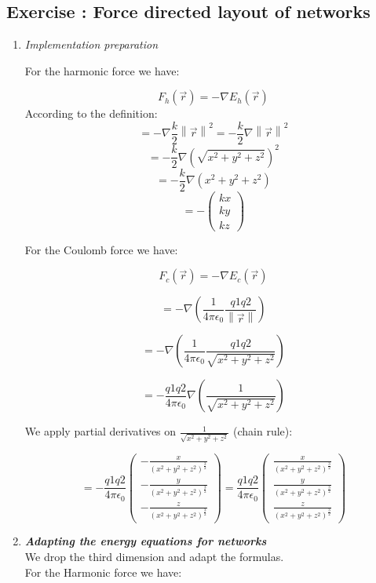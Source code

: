 \documentclass[10pt,a4paper]{article}
\newcommand{\norm}[1]{\left\lVert#1\right\rVert}
\newcommand{\exercise}[1]
{
  \stepcounter{subsection}
  \subsection*{Exercise \thesubsection: #1}

}
\begin{document}
\newpage
\exercise{Force directed layout of networks}
\begin{enumerate}
	
	\item \textit{Implementation preparation}
	
	For the harmonic force we have: 
	
	
\[ F_{h}(\vec{r}) = -\nabla E_{h}(\vec{r})\]
According to the definition: 
\[ = -\nabla \frac{k}{2} \norm{\vec{r}}^2 = -\frac{k}{2} \nabla \norm{\vec{r}}^2 \]
\[ = -\frac{k}{2}\nabla  (\sqrt{x^2 + y^2 + z^2})^2  \]
\[ = -\frac{k}{2}\nabla  (x^2 + y^2 + z^2)  \]
\[ = -\begin{pmatrix}
kx\\
ky\\
kz
	\end{pmatrix} \]


	For the Coulomb force we have: 
	
	\[ F_{c}(\vec{r}) = -\nabla E_{c}(\vec{r})\]

	\[ = -\nabla(\frac{1}{4\pi\epsilon_{0}} \frac{q1 q2}{\norm{\vec{r}}}) \]
	
	\[ = -\nabla(\frac{1}{4\pi\epsilon_{0}} \frac{q1 q2}{\sqrt{x^2 + y^2 + z^2}}) \]
	
	\[ = - \frac{q1 q2}{4\pi\epsilon_{0}} \nabla ( \frac{1}{\sqrt{x^2 + y^2 + z^2}}) \]
	
	We apply partial derivatives on $ \frac{1}{\sqrt{x^2 + y^2 + z^2}}$ (chain rule): 
	
	\[ = - \frac{q1 q2}{4\pi\epsilon_{0}} \begin{pmatrix}
	-\frac{x}{(x^2 + y^2 + z^2)^{\frac{3}{2}}}\\
	-\frac{y}{(x^2 + y^2 + z^2)^{\frac{3}{2}}}\\
	-\frac{z}{(x^2 + y^2 + z^2)^{\frac{3}{2}}}
	\end{pmatrix} = \frac{q1 q2}{4\pi\epsilon_{0}} \begin{pmatrix}
	\frac{x}{(x^2 + y^2 + z^2)^{\frac{3}{2}}}\\
	\frac{y}{(x^2 + y^2 + z^2)^{\frac{3}{2}}}\\
	\frac{z}{(x^2 + y^2 + z^2)^{\frac{3}{2}}}
	\end{pmatrix} \]
	
	
	
	\item \textit{\textbf{Adapting the energy equations for networks}}\\
	
	
	We drop the third dimension and adapt the formulas. \\
	For the Harmonic force we have: 
	

\end{enumerate}
\end{document}
